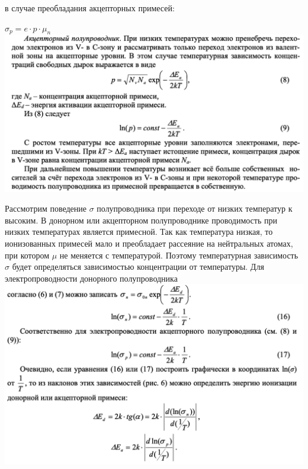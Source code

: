 \documentclass[a4paper,12pt]{article}
\begin{document}
в случае преобладания акцепторных примесей:
\begin{center}
$\sigma_p = e\cdot p \cdot \mu_n$\\
\includegraphics[height = 9 cm,width=18 cm]{2.png}\\
\end{center}

Рассмотрим поведение $\sigma$ полупроводника при переходе от низких температур к высоким. В донорном или акцепторном полупроводнике проводимость при низких температурах является примесной. Так как температура низкая, то ионизованных примесей мало и преобладает рассеяние на нейтральных атомах, при котором $\mu$ не меняется с температурой. Поэтому температурная зависимость $\sigma$ будет определяться зависимостью концентрации от температуры. Для электропроводности донорного полупроводника\\
\includegraphics[height = 9 cm,width=18 cm]{4.png}\\
\end{document}
